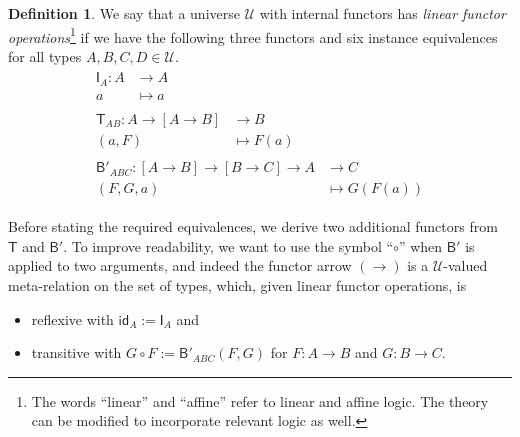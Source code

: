 \documentclass[a4paper]{article}
\theoremstyle{definition}
\newtheorem{definition}{Definition}[section]
\theoremstyle{remark}
\newcommand{\defn}{\emph}
\newcommand{\U}{\mathcal{U}}
\newcommand{\nm}{\mathsf}
\newcommand{\id}{\nm{id}}
\newcommand{\combinator}{\nm}
\newcommand{\idFun}{\combinator{I}}
\newcommand{\revAppFun}{\combinator{T}}
\newcommand{\compFun}{\combinator{B'}}
\begin{document}
\begin{definition}
  We say that a universe $\U$ with internal functors has \defn{linear functor
  operations}\footnote{The words ``linear'' and ``affine'' refer to linear and affine logic.
  The theory can be modified to incorporate relevant logic as well.}
  if we have the following three functors and six instance equivalences for all types
  $A,B,C,D \in \U.$
  \vspace{1ex}
  \begin{gather*}
    \begin{aligned}
      \idFun_A : A &\to     A\\
                 a &\mapsto a
    \end{aligned}\\[1em]
    \begin{aligned}
      \revAppFun_{AB} : A \to [A \to B] &\to     B\\
                        (a,F)           &\mapsto F(a)
    \end{aligned}\\[1em]
    \begin{aligned}
      \compFun_{ABC} : [A \to B] \to [B \to C] \to A &\to     C\\
                       (F,G,a)                       &\mapsto G(F(a))
    \end{aligned}
  \end{gather*}

  Before stating the required equivalences, we derive two additional functors from $\revAppFun$
  and $\compFun.$
  To improve readability, we want to use the symbol ``$\circ$'' when $\compFun$ is applied to
  two arguments, and indeed the functor arrow $(\to)$ is a $\U$-valued meta-relation on the
  set of types, which, given linear functor operations, is
  \begin{itemize}
    \item reflexive with $\id_A := \idFun_A$ and
    \item transitive with $G \circ F := \compFun_{ABC}(F,G)$ for $F : A \to B$ and
    $G : B \to C.$
  \end{itemize}


\end{definition}
\end{document}

